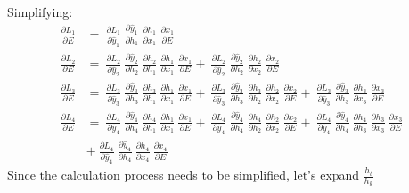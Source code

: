 \documentclass{article}
\begin{document}
Simplifying:
\begin{align*}
\frac{\partial L_1}{ \partial{E}} & = ~\frac{\partial L_1}{ \partial \hat{y}_1}~\frac{\partial \hat{y}_1}{ \partial h_1}
  ~\frac{\partial h_1}{ \partial x_1} ~\frac{\partial x_1}{ \partial E} \\
	\frac{\partial L_2}{ \partial{E}} & = ~\frac{\partial L_2}{ \partial \hat{y}_2}~\frac{\partial \hat{y}_2}{ \partial h_2}
 ~\frac{\partial h_2}{ \partial h_1} ~\frac{\partial h_1}{ \partial x_1} ~\frac{\partial x_1}{ \partial E}	+ ~\frac{\partial L_2}{ \partial \hat{y}_2}~\frac{\partial \hat{y}_2}{ \partial h_2}
  ~\frac{\partial h_2}{ \partial x_2} ~\frac{\partial x_2}{ \partial E} \\
 \frac{\partial L_3}{ \partial{E}} & = ~\frac{\partial L_3}{ \partial \hat{y}_3}~\frac{\partial \hat{y}_3}{ \partial h_3}
 ~\frac{\partial h_3}{ \partial h_1} ~\frac{\partial h_1}{ \partial x_1} ~\frac{\partial x_1}{ \partial E}	+ ~\frac{\partial L_3}{ \partial \hat{y}_3}~\frac{\partial \hat{y}_3}{ \partial h_3}
 ~\frac{\partial h_3}{ \partial h_2} ~\frac{\partial h_2}{ \partial x_2} ~\frac{\partial x_2}{ \partial E} +  ~\frac{\partial L_3}{ \partial \hat{y}_3}~\frac{\partial \hat{y}_3}{ \partial h_3}
  ~\frac{\partial h_3}{ \partial x_3} ~\frac{\partial x_3}{ \partial E} \\
 \frac{\partial L_4}{ \partial{E}} & = ~\frac{\partial L_4}{ \partial \hat{y}_4}~\frac{\partial \hat{y}_4}{ \partial h_4}
 ~\frac{\partial h_4}{ \partial h_1} ~\frac{\partial h_1}{ \partial x_1} ~\frac{\partial x_1}{ \partial E}	+ ~\frac{\partial L_4}{ \partial \hat{y}_4}~\frac{\partial \hat{y}_4}{ \partial h_4}
 ~\frac{\partial h_4}{ \partial h_2} ~\frac{\partial h_2}{ \partial x_2} ~\frac{\partial x_2}{ \partial E} +  ~\frac{\partial L_4}{ \partial \hat{y}_4}~\frac{\partial \hat{y}_4}{ \partial h_4}
 ~\frac{\partial h_4}{ \partial h_3} ~\frac{\partial h_3}{ \partial x_3} ~\frac{\partial x_3}{ \partial E} \\&+ ~\frac{\partial L_4}{ \partial \hat{y}_4}~\frac{\partial \hat{y}_4}{ \partial h_4}
  ~\frac{\partial h_4}{ \partial x_4} ~\frac{\partial x_4}{ \partial E}
\end{align*}
Since the calculation process needs to be simplified, let's expand $\frac{h_t}{h_k}$
\end{document}

